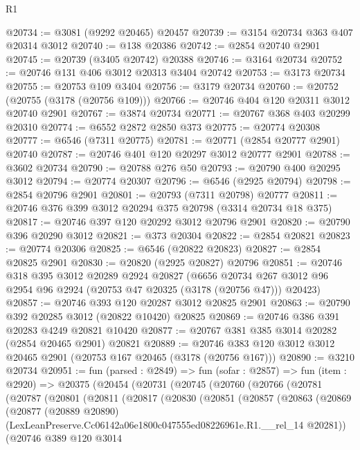 \begin{lexlean}{R1}
\begin{coremodule}
@20734 := @3081 (@9292 @20465) @20457
@20739 := @3154 @20734 @363 @407 @20314 @3012
@20740 := @138 @20386
@20742 := @2854 @20740 @2901
@20745 := @20739 (@3405 @20742) @20388
@20746 := @3164 @20734
@20752 := @20746 @131 @406 @3012 @20313 @3404 @20742
@20753 := @3173 @20734
@20755 := @20753 @109 @3404
@20756 := @3179 @20734
@20760 := @20752 (@20755 (@3178 (@20756 @109)))
@20766 := @20746 @404 @120 @20311 @3012 @20740 @2901
@20767 := @3874 @20734
@20771 := @20767 @368 @403 @20299 @20310
@20774 := @6552 @2872 @2850 @373
@20775 := @20774 @20308
@20777 := @6546 (@7311 @20775)
@20781 := @20771 (@2854 @20777 @2901) @20740
@20787 := @20746 @401 @120 @20297 @3012 @20777 @2901
@20788 := @3602 @20734
@20790 := @20788 @276 @50
@20793 := @20790 @400 @20295 @3012
@20794 := @20774 @20307
@20796 := @6546 (@2925 @20794)
@20798 := @2854 @20796 @2901
@20801 := @20793 (@7311 @20798) @20777
@20811 := @20746 @376 @399 @3012 @20294 @375 @20798 (@3314 @20734 @18 @375)
@20817 := @20746 @397 @120 @20292 @3012 @20796 @2901
@20820 := @20790 @396 @20290 @3012
@20821 := @373 @20304
@20822 := @2854 @20821
@20823 := @20774 @20306
@20825 := @6546 (@20822 @20823)
@20827 := @2854 @20825 @2901
@20830 := @20820 (@2925 @20827) @20796
@20851 := @20746
    @318
    @395
    @3012
    @20289
    @2924
    @20827
    (@6656 @20734 @267 @3012 @96 @2954 @96 @2924 (@20753 @47 @20325 (@3178 (@20756 @47))) @20423)
@20857 := @20746 @393 @120 @20287 @3012 @20825 @2901
@20863 := @20790 @392 @20285 @3012 (@20822 @10420) @20825
@20869 := @20746 @386 @391 @20283 @4249 @20821 @10420
@20877 := @20767 @381 @385 @3014 @20282 (@2854 @20465 @2901) @20821
@20889 := @20746 @383 @120 @3012 @3012 @20465 @2901 (@20753 @167 @20465 (@3178 (@20756 @167)))
@20890 := @3210 @20734
@20951 := fun (parsed : @2849) =>
  fun (sofar : @2857) =>
  fun (item : @2920) =>
  @20375
    (@20454
      (@20731
        (@20745
          (@20760
            (@20766
              (@20781
                (@20787
                  (@20801
                    (@20811
                      (@20817
                        (@20830
                          (@20851
                            (@20857
                              (@20863
                                (@20869
                                  (@20877
                                    (@20889 @20890)
                                    (LexLeanPreserve.Cc06142a06e1800c047555ed08226961e.R1.__rel_14
                                      @20281))
                                  (@20746
                                    @389
                                    @120
                                    @3014

\end{coremodule}
\end{lexlean}
